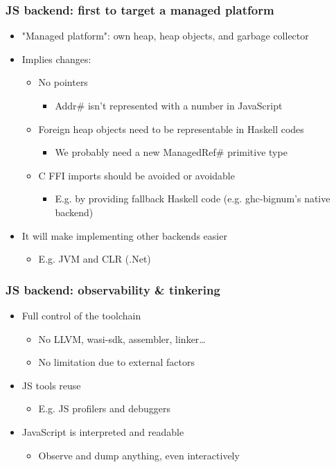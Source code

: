 \documentclass[aspectratio=169]{beamer}
\begin{document}
\begin{frame}
\frametitle{JS backend: first to target a managed platform}
\begin{itemize}
\item "Managed platform": own heap, heap objects, and garbage collector
\item Implies changes:
\begin{itemize}
\item No pointers
\begin{itemize}
\item Addr\# isn't represented with a number in JavaScript
\end{itemize}
\item Foreign heap objects need to be representable in Haskell codes
\begin{itemize}
\item We probably need a new ManagedRef\# primitive type
\end{itemize}
\item C FFI imports should be avoided or avoidable
\begin{itemize}
\item E.g. by providing fallback Haskell code (e.g. ghc-bignum's native backend)
\end{itemize}
\end{itemize}
\item It will make implementing other backends easier
\begin{itemize}
\item E.g. JVM and CLR (.Net)
\end{itemize}
\end{itemize}
\end{frame}


\begin{frame}
\frametitle{JS backend: observability \& tinkering}

\begin{itemize}
\item Full control of the toolchain 
\begin{itemize}
\item No LLVM, wasi-sdk, assembler, linker…
\item No limitation due to external factors
\end{itemize}
\item JS tools reuse
\begin{itemize}
\item E.g. JS profilers and debuggers
\end{itemize}
\item JavaScript is interpreted and readable
\begin{itemize}
\item Observe and dump anything, even interactively
\end{itemize}
\end{itemize}
\end{frame}
\end{document}
